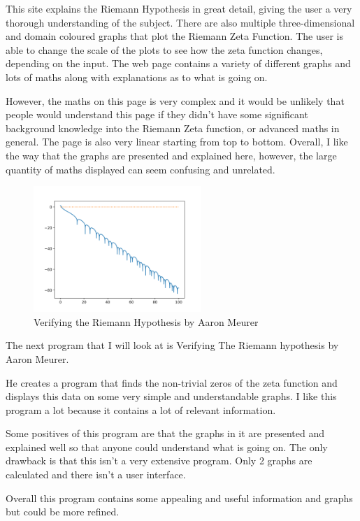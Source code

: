 \documentclass{article}
\begin{document}
This site explains the Riemann Hypothesis in great detail, giving the user a very thorough understanding of the subject. There are also multiple three-dimensional and domain coloured graphs that plot the Riemann Zeta Function. The user is able to change the scale of the plots to see how the zeta function changes, depending on the input. The web page contains a variety of different graphs and lots of maths along with explanations as to what is going on.

However, the maths on this page is very complex and it would be unlikely that people would understand this page if they didn't have some significant background knowledge into the Riemann Zeta function, or advanced maths in general. The page is also very linear starting from top to bottom. Overall, I like the way that the graphs are presented and explained here, however, the large quantity of maths displayed can seem confusing and unrelated.

\begin{figure}
    \centering
    \captionsetup{justification=centering}
    \includegraphics[width=2.5in]{verifying-riemann-hypothesis}
    \caption{Verifying the Riemann Hypothesis by Aaron Meurer}
\end{figure}

The next program that I will look at is Verifying The Riemann hypothesis by Aaron Meurer.

He creates a program that finds the non-trivial zeros of the zeta function and displays this data on some very simple and understandable graphs. I like this program a lot because it contains a lot of relevant information.

Some positives of this program are that the graphs in it are presented and explained well so that anyone could understand what is going on. The only drawback is that this isn't a very extensive program. Only 2 graphs are calculated and there isn't a user interface.

Overall this program contains some appealing and useful information and graphs but could be more refined.
\clearpage
\end{document}
